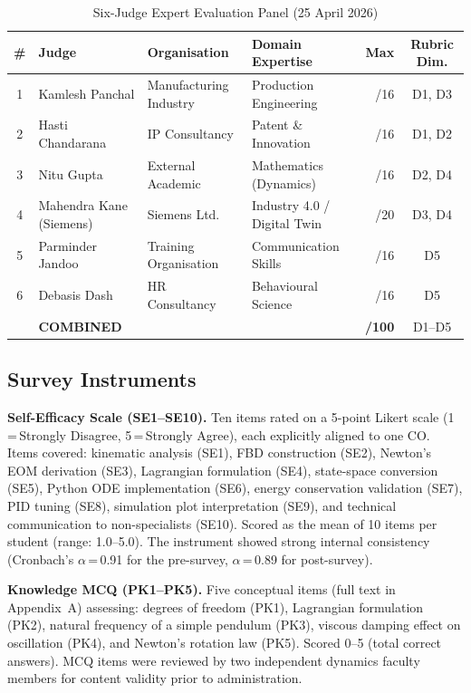 \documentclass[utf8]{FrontiersinHarvard}
\begin{document}
\begin{table}[h]
\caption{Six-Judge Expert Evaluation Panel (25 April 2026)}
\label{tab:judges}
\begin{tabular}{clllrc}
\toprule
\textbf{\#} & \textbf{Judge} & \textbf{Organisation} &
\textbf{Domain Expertise} & \textbf{Max} & \textbf{Rubric Dim.} \\
\midrule
1 & Kamlesh Panchal         & Manufacturing Industry & Production Engineering      & /16 & D1, D3 \\
2 & Hasti Chandarana        & IP Consultancy         & Patent \& Innovation        & /16 & D1, D2 \\
3 & Nitu Gupta              & External Academic      & Mathematics (Dynamics)      & /16 & D2, D4 \\
4 & Mahendra Kane (Siemens) & Siemens Ltd.           & Industry 4.0 / Digital Twin & /20 & D3, D4 \\
5 & Parminder Jandoo        & Training Organisation  & Communication Skills        & /16 & D5     \\
6 & Debasis Dash            & HR Consultancy         & Behavioural Science         & /16 & D5     \\
\midrule
  & \textbf{COMBINED}       &                        &                             & \textbf{/100} & D1--D5 \\
\bottomrule
\end{tabular}
\end{table}

\subsection{Survey Instruments}

\textbf{Self-Efficacy Scale (SE1--SE10).} Ten items rated on a 5-point
Likert scale (1\,=\,Strongly Disagree, 5\,=\,Strongly Agree), each
explicitly aligned to one CO. Items covered: kinematic analysis (SE1),
FBD construction (SE2), Newton's EOM derivation (SE3), Lagrangian
formulation (SE4), state-space conversion (SE5), Python ODE implementation
(SE6), energy conservation validation (SE7), PID tuning (SE8), simulation
plot interpretation (SE9), and technical communication to non-specialists
(SE10). Scored as the mean of 10 items per student (range: 1.0--5.0).
The instrument showed strong internal consistency (Cronbach's
$\alpha$\,=\,0.91 for the pre-survey, $\alpha$\,=\,0.89 for post-survey).

\textbf{Knowledge MCQ (PK1--PK5).} Five conceptual items (full text in
Appendix~A) assessing: degrees of freedom (PK1), Lagrangian formulation
(PK2), natural frequency of a simple pendulum (PK3), viscous damping
effect on oscillation (PK4), and Newton's rotation law (PK5). Scored
0--5 (total correct answers). MCQ items were reviewed by two independent
dynamics faculty members for content validity prior to administration.
\end{document}
